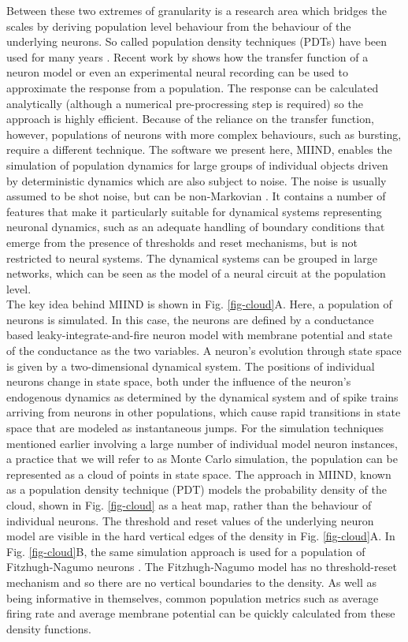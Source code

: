 \documentclass[utf8]{frontiersSCNS} %
\begin{document}
Between these two extremes of granularity is a research area which bridges the scales by deriving population level behaviour from the behaviour of the underlying neurons. So called population density techniques (PDTs) have been used for many years \citep{knight1996dynamical,omurtag2000}. Recent work by \cite{carlu2020mean} shows how the transfer function of a neuron model or even an experimental neural recording can be used to approximate the response from a population. The response can be calculated analytically (although a numerical pre-procressing step is required) so the approach is highly efficient. Because of the reliance on the transfer function, however, populations of neurons with more complex behaviours, such as bursting, require a different technique. The software we present here, MIIND, enables the simulation of population dynamics for large groups of individual objects driven by deterministic dynamics which are also subject to noise. The noise is usually assumed to be shot noise, but can be non-Markovian \citep{lai2017population}. 
It contains a number of features that make it particularly suitable for dynamical systems representing neuronal dynamics, such as an adequate handling of boundary conditions that emerge from the presence of thresholds and reset mechanisms, but is not restricted to neural systems. The dynamical systems can be grouped in large networks, which can be seen as the model of a neural circuit at the population level.\\

The key idea behind MIIND is shown in Fig. \ref{fig-cloud}A. Here, a population of neurons is simulated. In this case, the neurons are defined by a conductance based leaky-integrate-and-fire neuron model with membrane potential and state of the conductance as the two variables. A neuron's evolution through state space is given by a two-dimensional dynamical system. The positions of individual neurons change in state space, both under the influence of the neuron's endogenous dynamics as determined by the dynamical system and of spike trains arriving from neurons in other populations, which cause rapid transitions in state space that are modeled as instantaneous jumps. For the simulation techniques mentioned earlier involving a large number of individual model neuron instances, a practice that we will refer to as Monte Carlo simulation, the population can be represented as a cloud of points in state space. The approach in MIIND, known as a population density technique (PDT) models the probability density of the cloud, shown in Fig. \ref{fig-cloud} as a heat map, rather than the behaviour of individual neurons. The threshold and reset values of the underlying neuron model are visible in the hard vertical edges of the density in Fig. \ref{fig-cloud}A. In Fig. \ref{fig-cloud}B, the same simulation approach is used for a population of Fitzhugh-Nagumo neurons \citep{nagumo1962active,fitzhugh1961impulses}. The Fitzhugh-Nagumo model has no threshold-reset mechanism and so there are no vertical boundaries to the density. As well as being informative in themselves, common population metrics such as average firing rate and average membrane potential can be quickly calculated from these density functions. \\
\end{document}
